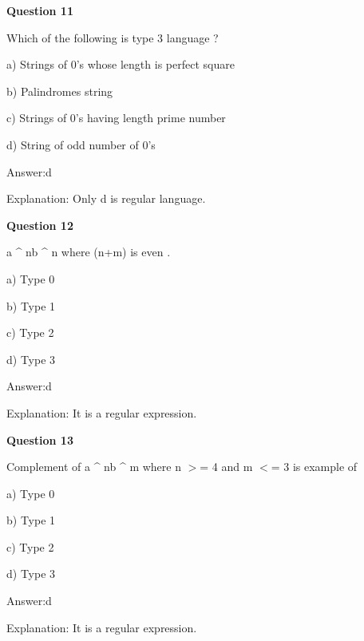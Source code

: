 \documentclass{article}
\begin{document}
\begin{mdframed}[linewidth=1pt, roundcorner=5pt, linecolor=gray!30, backgroundcolor=gray!5]
\textbf{Question 11} 

Which of the following is type 3 language ?

a) Strings of 0's whose length is perfect square

b) Palindromes string

c) Strings of 0's having length prime number

d) String of odd number of 0's
\vspace{5pt} \par
\begin{tcolorbox}[colback=green!5, colframe=green!40!black, title=Solution]
Answer:d

Explanation: Only d is regular language.
\end{tcolorbox}
\end{mdframed}

\begin{mdframed}[linewidth=1pt, roundcorner=5pt, linecolor=gray!30, backgroundcolor=gray!5]
\textbf{Question 12} 

a \textasciicircum{} nb \textasciicircum{} n where (n+m) is even .

a) Type 0

b) Type 1

c) Type 2

d) Type 3
\vspace{5pt} \par
\begin{tcolorbox}[colback=green!5, colframe=green!40!black, title=Solution]
Answer:d

Explanation: It is a regular expression.
\end{tcolorbox}
\end{mdframed}

\begin{mdframed}[linewidth=1pt, roundcorner=5pt, linecolor=gray!30, backgroundcolor=gray!5]
\textbf{Question 13} 

Complement of a \textasciicircum{} nb \textasciicircum{} m where n $>$= 4 and m $<$= 3 is example of

a) Type 0

b) Type 1

c) Type 2

d) Type 3
\vspace{5pt} \par
\begin{tcolorbox}[colback=green!5, colframe=green!40!black, title=Solution]
Answer:d

Explanation: It is a regular expression.
\end{tcolorbox}
\end{mdframed}
\newpage
\end{document}
